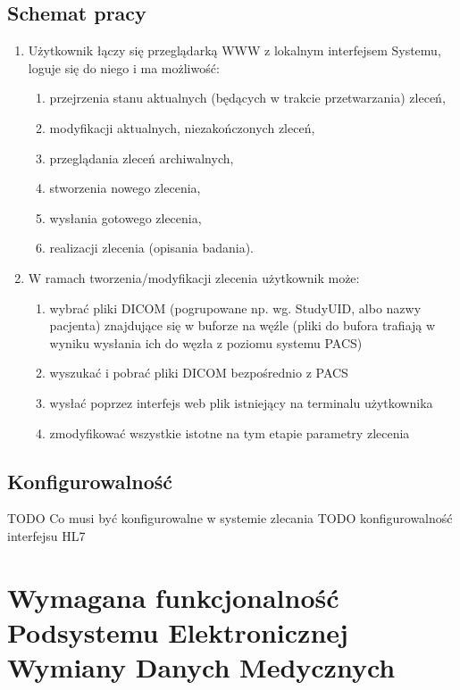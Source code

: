 \documentclass[a4paper]{article}
\begin{document}
\subsection{Schemat pracy}
\begin{enumerate}
\item Użytkownik łączy się przeglądarką WWW z lokalnym interfejsem Systemu, loguje się do niego i ma możliwość:
        \begin{enumerate}
        \item przejrzenia stanu aktualnych (będących w trakcie przetwarzania) zleceń,
        \item modyfikacji aktualnych, niezakończonych zleceń,
        \item przeglądania zleceń archiwalnych,
        \item stworzenia nowego zlecenia,
        \item wysłania gotowego zlecenia,
        \item realizacji zlecenia (opisania badania).
        \end{enumerate}
\item W ramach tworzenia/modyfikacji zlecenia użytkownik może:
        \begin{enumerate}
        \item wybrać pliki DICOM (pogrupowane np. wg. StudyUID, albo nazwy pacjenta) znajdujące się w buforze na węźle (pliki do bufora trafiają w wyniku wysłania ich do węzła z poziomu systemu PACS)
        \item wyszukać i pobrać pliki DICOM bezpośrednio z PACS
        \item wysłać poprzez interfejs web plik istniejący na terminalu użytkownika
        \item zmodyfikować wszystkie istotne na tym etapie parametry zlecenia
        \end{enumerate}
\end{enumerate}

\subsection{Konfigurowalność}

TODO Co musi być konfigurowalne w systemie zlecania 
TODO konfigurowalność interfejsu HL7

\section{Wymagana funkcjonalność Podsystemu Elektronicznej Wymiany Danych Medycznych}
\end{document}
